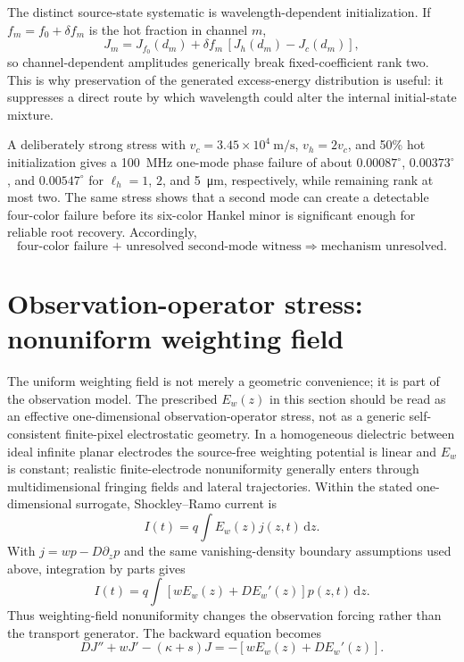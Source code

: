 \documentclass[11pt]{article}
\newcommand{\dd}{\mathrm{d}}
\begin{document}
The distinct source-state systematic is wavelength-dependent initialization. If $f_m=f_0+\delta f_m$ is the hot fraction in channel $m$,
\begin{equation}
J_m=J_{f_0}(d_m)+\delta f_m\,[J_h(d_m)-J_c(d_m)],
\end{equation}
so channel-dependent amplitudes generically break fixed-coefficient rank two. This is why preservation of the generated excess-energy distribution is useful: it suppresses a direct route by which wavelength could alter the internal initial-state mixture.

A deliberately strong stress with $v_c=3.45\times10^4~\mathrm{m/s}$, $v_h=2v_c$, and 50\% hot initialization gives a \SI{100}{MHz} one-mode phase failure of about $0.00087^\circ$, $0.00373^\circ$, and $0.00547^\circ$ for $\ell_h=1$, $2$, and \SI{5}{\micro\meter}, respectively, while remaining rank at most two. The same stress shows that a second mode can create a detectable four-color failure before its six-color Hankel minor is significant enough for reliable root recovery. Accordingly,
\begin{equation*}
\boxed{\text{four-color failure + unresolved second-mode witness}\Rightarrow\text{mechanism unresolved}.}
\end{equation*}

\section{Observation-operator stress: nonuniform weighting field}

The uniform weighting field is not merely a geometric convenience; it is part of the observation model. The prescribed $E_w(z)$ in this section should be read as an effective one-dimensional observation-operator stress, not as a generic self-consistent finite-pixel electrostatic geometry. In a homogeneous dielectric between ideal infinite planar electrodes the source-free weighting potential is linear and $E_w$ is constant; realistic finite-electrode nonuniformity generally enters through multidimensional fringing fields and lateral trajectories. Within the stated one-dimensional surrogate, Shockley--Ramo current is
\begin{equation}
I(t)=q\int E_w(z)j(z,t)\,\dd z.
\end{equation}
With $j=wp-D\partial_zp$ and the same vanishing-density boundary assumptions used above, integration by parts gives
\begin{equation}
\boxed{I(t)=q\int\left[wE_w(z)+DE_w'(z)\right]p(z,t)\,\dd z.}
\label{eq:weighting_operator}
\end{equation}
Thus weighting-field nonuniformity changes the observation forcing rather than the transport generator. The backward equation becomes
\begin{equation}
\boxed{DJ''+wJ'-(\kappa+s)J=-\left[wE_w(z)+DE_w'(z)\right].}
\label{eq:weighting_bvp}
\end{equation}
\end{document}
